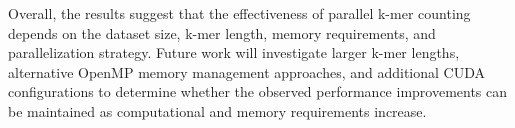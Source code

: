 \documentclass{article}
\begin{document}
\vspace{\baselineskip}

Overall, the results suggest that the effectiveness of parallel k-mer counting depends on the dataset size,
k-mer length, memory requirements, and parallelization strategy. Future work will investigate larger
k-mer lengths, alternative OpenMP memory management approaches, and additional CUDA configurations
to determine whether the observed performance improvements can be maintained as computational and
memory requirements increase.

\vspace{\baselineskip}


\clearpage



\end{document}
